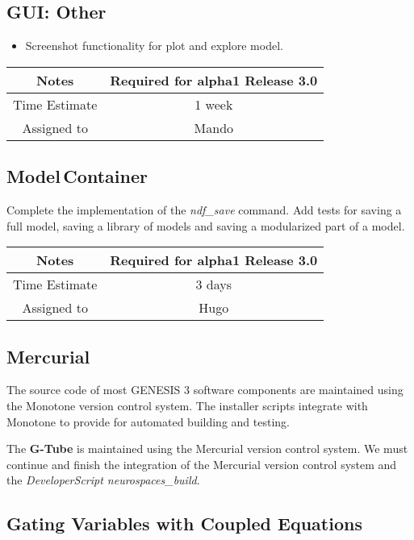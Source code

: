 \documentclass[12pt]{article}
\begin{document}
\subsection{GUI: Other}
\begin{itemize}
\item Screenshot functionality for plot and explore model.
\end{itemize}

{
  \vspace{5mm}
  \centering
  \begin{tabular}{|c|c|}
    \hline
    Notes
    & Required for alpha1 Release 3.0 \\
    \hline
    Time Estimate
    & 1 week \\
    \hline
    Assigned to
    & Mando \\
    \hline
  \end{tabular}
}


\subsection{Model\,Container}
Complete the implementation of the {\it ndf\_save} command.  Add tests for
saving a full model, saving a library of models and saving a
modularized part of a model.

{
  \vspace{5mm}
  \centering
  \begin{tabular}{|c|c|}
    \hline
    Notes
    & Required for alpha1 Release 3.0 \\
    \hline
    Time Estimate
    & 3 days \\
    \hline
    Assigned to
    & Hugo \\
    \hline
  \end{tabular}
}


\subsection{Mercurial}

The source code of most GENESIS 3 software components are maintained
using the Monotone version control system.  The installer scripts
integrate with Monotone to provide for automated building and testing.

The {\bf G-Tube} is maintained using the Mercurial version control system.
We must continue and finish the integration of the Mercurial version
control system and the {\it DeveloperScript neurospaces\_build}.


\subsection{Gating Variables with Coupled Equations}
\end{document}
